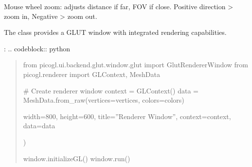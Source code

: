 \documentclass[a4paper,10pt,english,openany,oneside]{sphinxmanual}
\begin{document}
\begin{fulllineitems}
\begin{fulllineitems}
\label{\detokenize{api/ui:picogl.ui.backend.glut.window.glut.GlutRendererWindow.wheelEvent}}
\pysigstartsignatures
\pysiglinewithargsret
{}
{\sphinxparamcomma {}\sphinxparamcomma {}\sphinxparamcomma {}}
{}
\pysigstopsignatures
\sphinxAtStartPar
Mouse wheel zoom: adjusts distance if far, FOV if close.
Positive direction \sphinxhyphen{}\textgreater{} zoom in, Negative \sphinxhyphen{}\textgreater{} zoom out.

\end{fulllineitems}


\begin{fulllineitems}
\label{\detokenize{api/ui:picogl.ui.backend.glut.window.glut.GlutRendererWindow.get_size}}
\pysigstartsignatures
\pysiglinewithargsret
{}
{}
{}
\pysigstopsignatures
\end{fulllineitems}


\end{fulllineitems}


\sphinxAtStartPar
The  class provides a GLUT window with integrated rendering capabilities.

\sphinxAtStartPar
{}:
.. code\sphinxhyphen{}block:: python
\begin{quote}

\sphinxAtStartPar
from picogl.ui.backend.glut.window.glut import GlutRendererWindow
from picogl.renderer import GLContext, MeshData

\sphinxAtStartPar
\# Create renderer window
context = GLContext()
data = MeshData.from\_raw(vertices=vertices, colors=colors)
\begin{description}
\sphinxAtStartPar
width=800,
height=600,
title=”Renderer Window”,
context=context,
data=data

\end{description}

\sphinxAtStartPar
)

\sphinxAtStartPar
window.initializeGL()
window.run()
\end{quote}
\end{document}
